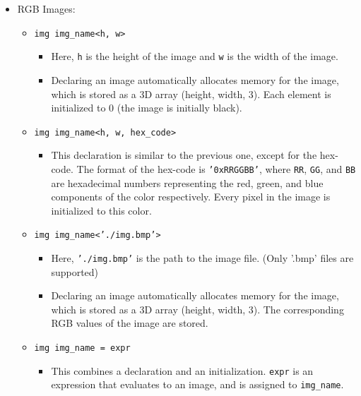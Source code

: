 \documentclass[a4paper, 11pt]{article}
\begin{document}
\begin{itemize}
        \item RGB Images: 
            \begin{itemize}
              \item \texttt{img img\_name<h, w>}
              \begin{itemize}
                \item Here, \texttt{h} is the height of the image and \texttt{w} is the width of the image.
                \item Declaring an image automatically allocates memory for the image, which is stored as a 3D array (height, width, $3$). Each element is initialized to 0 (the image is initially black).
              \end{itemize}
              \item \texttt{img img\_name<h, w, hex\_code>}
              \begin{itemize}
                \item This declaration is similar to the previous one, except for the hex-code. The format of the hex-code is \texttt{'0xRRGGBB'}, where \texttt{RR}, \texttt{GG}, and \texttt{BB} are hexadecimal numbers representing the red, green, and blue components of the color respectively. Every pixel in the image is initialized to this color.
              \end{itemize}
              \item \texttt{img img\_name<'./img.bmp'>}
              \begin{itemize}
                \item Here, \texttt{'./img.bmp'} is the path to the image file. (Only '.bmp' files are supported)
                \item Declaring an image automatically allocates memory for the image, which is stored as a 3D array (height, width, $3$). The corresponding RGB values of the image are stored.
              \end{itemize}
              \item \texttt{img img\_name = expr}
              \begin{itemize}
                \item This combines a declaration and an initialization. \texttt{expr} is an expression that evaluates to an image, and is assigned to \texttt{img\_name}.
              \end{itemize}
            \end{itemize}



\end{itemize}
\end{document}
